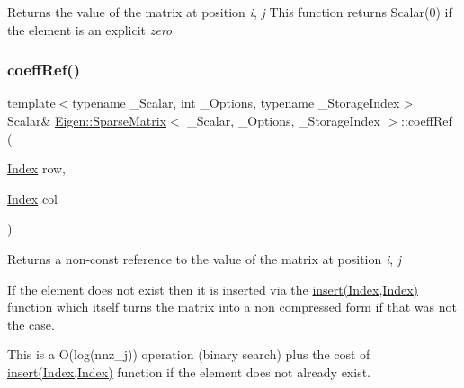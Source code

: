 \begin{DoxyReturn}{Returns}
the value of the matrix at position {\itshape i}, {\itshape j} This function returns Scalar(0) if the element is an explicit {\itshape zero} 
\end{DoxyReturn}
\mbox{\label{class_eigen_1_1_sparse_matrix_a013197b3f598968ff37ed8c97087f1ef}} 
\subsubsection{\texorpdfstring{coeffRef()}{coeffRef()}}
{\footnotesize\ttfamily template$<$typename \+\_\+\+Scalar, int \+\_\+\+Options, typename \+\_\+\+Storage\+Index$>$ \\
Scalar\& \mbox{\hyperlink{class_eigen_1_1_sparse_matrix}{Eigen\+::\+Sparse\+Matrix}}$<$ \+\_\+\+Scalar, \+\_\+\+Options, \+\_\+\+Storage\+Index $>$\+::coeff\+Ref (\begin{DoxyParamCaption}\item[{\mbox{\hyperlink{struct_eigen_1_1_eigen_base_a554f30542cc2316add4b1ea0a492ff02}{Index}}}]{row,  }\item[{\mbox{\hyperlink{struct_eigen_1_1_eigen_base_a554f30542cc2316add4b1ea0a492ff02}{Index}}}]{col }\end{DoxyParamCaption})\hspace{0.3cm}{\ttfamily [inline]}}

\begin{DoxyReturn}{Returns}
a non-\/const reference to the value of the matrix at position {\itshape i}, {\itshape j} 
\end{DoxyReturn}
If the element does not exist then it is inserted via the \mbox{\hyperlink{class_eigen_1_1_sparse_matrix_aae45e3b5fec7f6a0cdd10eec7c6d3666}{insert(\+Index,\+Index)}} function which itself turns the matrix into a non compressed form if that was not the case.

This is a O(log(nnz\+\_\+j)) operation (binary search) plus the cost of \mbox{\hyperlink{class_eigen_1_1_sparse_matrix_aae45e3b5fec7f6a0cdd10eec7c6d3666}{insert(\+Index,\+Index)}} function if the element does not already exist. \mbox{\label{class_eigen_1_1_sparse_matrix_aa391750e3c530227e4a5c3c52e959975}} 

